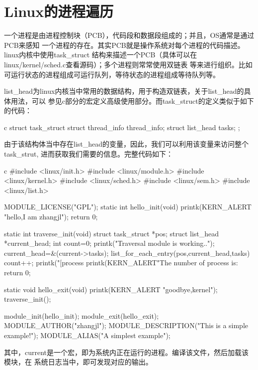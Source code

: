 \section{Linux的进程遍历}
一个进程是由进程控制块（PCB），代码段和数据段组成的；并且，OS通常是通过PCB来感知
一个进程的存在。其实PCB就是操作系统对每个进程的代码描述。linux内核中使用task\_struct
结构来描述一个PCB（具体可以在linux/kernel/sched.c查看源码）；多个进程则常常使用双链表
等来进行组织。比如可运行状态的进程组成可运行队列，等待状态的进程组成等待队列等。

list\_head为linux内核当中常用的数据结构，用于构造双链表，关于list\_head的具体用法，可以
参见c部分的宏定义高级使用部分。而task\_struct的定义类似于如下的代码：
\begin{code-block}{c}
struct task_struct {
        struct thread_info    thread_info;
        struct list_head      tasks;
};
\end{code-block}

由于该结构体当中存在list\_head的变量，因此，我们可以利用该变量来访问整个task\_strut,
进而获取我们需要的信息。完整代码如下：
\begin{code-block}{c}
#include <linux/init.h>
#include <linux/module.h>
#include <linux/kernel.h>
#include <linux/sched.h>
#include <linux/sem.h>
#include <linux/list.h>

MODULE_LICENSE("GPL");
static int hello_init(void)
{
        printk(KERN_ALERT "hello,I am zhangjl\n");
        return 0;
}

static int traverse_init(void)
{
       struct task_struct *pos;
       struct list_head *current_head;
       int count=0;
       printk("Traversal module is working..\n");
       current_head=&(current->tasks);
       list_for_each_entry(pos,current_head,tasks)
       {
              count++;
              printk("[process %
       }
       printk(KERN_ALERT"The number of process is:%
       return 0;
}

static void hello_exit(void)
{
    printk(KERN_ALERT "goodbye,kernel\n");
    traverse_init();
}

module_init(hello_init);
module_exit(hello_exit);
MODULE_AUTHOR("zhangjl");
MODULE_DESCRIPTION("This is a simple example!\n");
MODULE_ALIAS("A simplest example");

\end{code-block}

其中，current是一个宏，即为系统内正在运行的进程。编译该文件，然后加载该模块，在
系统日志当中，即可发现对应的输出。



